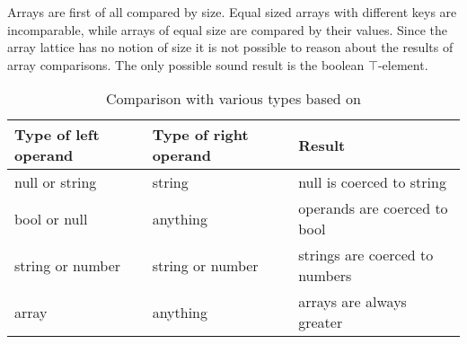 Arrays are first of all compared by size. Equal sized arrays with different keys are incomparable, while arrays of equal size are compared by their values. Since the array lattice has no notion of size it is not possible to reason about the results of array comparisons. The only possible sound result is the boolean $\top$-element.

\begin{table}[htbp]
\centering
\begin{tabular}{l|l||l}
Type of left operand & Type of right operand & Result \\\hline\hline
null or string & string & null is coerced to string \\\hline
bool or null & anything & operands are coerced to bool \\\hline
string or number & string or number & strings are coerced to numbers \\\hline
array & anything & arrays are always greater
\end{tabular}
\caption{Comparison with various types based on \protect{}}
\label{tab:comparisons}
\end{table}
